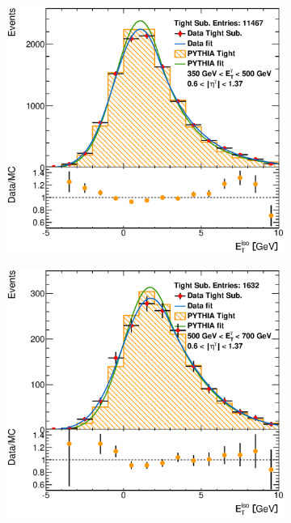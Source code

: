 \documentclass[12pt, twoside]{article}
\numberwithin{equation}{section}
\numberwithin{figure}{section}
\newenvironment{changemargin}[2]{%
\begin{list}{}{%
\setlength{\topsep}{0pt}%
\setlength{\leftmargin}{#1}%
\setlength{\rightmargin}{#2}%
\setlength{\listparindent}{\parindent}%
\setlength{\itemindent}{\parindent}%
\setlength{\parsep}{\parskip}%
}%
\item[]}{\end{list}}
\begin{document}
\begin{figure}[H]
\begin{changemargin}{-1.0cm}{-0.75cm}
\begin{changemargin}{-0.75cm}{-1.0cm}
        \begin{subfigure}[b]{0.27\textwidth}
            \includegraphics[width=\textwidth]{./images/EtISOCorrection/T_MC_FITS-24(10GeV)(After).eps}
        \end{subfigure}
        \begin{subfigure}[b]{0.27\textwidth}
            \includegraphics[width=\textwidth]{./images/EtISOCorrection/T_MC_FITS-25(10GeV)(After).eps}

\end{subfigure}
\end{changemargin}
\end{changemargin}
\end{figure}
\end{document}
